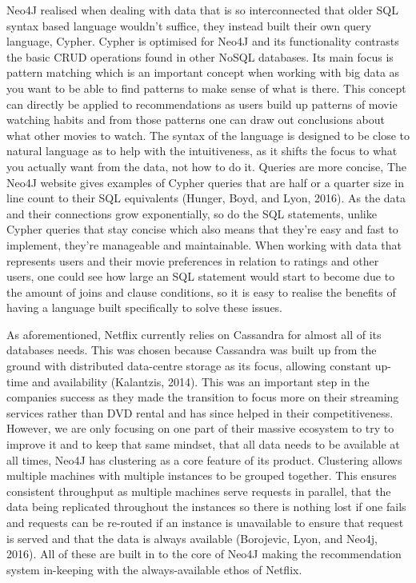 \documentclass[a4paper]{article}
\begin{document}
Neo4J realised when dealing with data that is so interconnected that older SQL syntax based language wouldn't suffice, they instead built their own query language, Cypher. Cypher is optimised for Neo4J and its functionality contrasts the basic CRUD operations found in other NoSQL databases. Its main focus is pattern matching which is an important concept when working with big data as you want to be able to find patterns to make sense of what is there. This concept can directly be applied to recommendations as users build up patterns of movie watching habits and from those patterns one can draw out conclusions about what other movies to watch. The syntax of the language is designed to be close to natural language as to help with the intuitiveness, as it shifts the focus to what you actually want from the data, not how to do it. Queries are more concise, The Neo4J website gives examples of Cypher queries that are half or a quarter size in line count to their SQL equivalents (Hunger, Boyd, and Lyon, 2016). As the data and their connections grow exponentially, so do the SQL statements, unlike Cypher queries that stay concise which also means that they're easy and fast to implement, they're manageable and maintainable. When working with data that represents users and their movie preferences in relation to ratings and other users, one could see how large an SQL statement would start to become due to the amount of joins and clause conditions, so it is easy to realise the benefits of having a language built specifically to solve these issues. \par

As aforementioned, Netflix currently relies on Cassandra for almost all of its databases needs. This was chosen because Cassandra was built up from the ground with distributed data-centre storage as its focus, allowing constant up-time and availability (Kalantzis, 2014). This was an important step in the companies success as they made the transition to focus more on their streaming services rather than DVD rental and has since helped in their competitiveness. However, we are only focusing on one part of their massive ecosystem to try to improve it and to keep that same mindset, that all data needs to be available at all times, Neo4J has clustering as a core feature of its product. Clustering allows multiple machines with multiple instances to be grouped together. This ensures consistent throughput as multiple machines serve requests in parallel, that the data being replicated throughout the instances so there is nothing lost if one fails and requests can be re-routed if an instance is unavailable to ensure that request is served and that the data is always available (Borojevic, Lyon, and Neo4j, 2016). All of these are built in to the core of Neo4J making the recommendation system in-keeping with the always-available ethos of Netflix. \par
\end{document}
